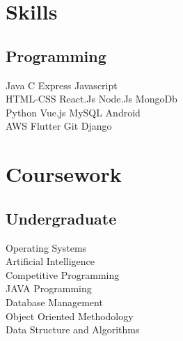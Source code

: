 \documentclass[]{deedy-resume-openfont}
\begin{document}
\begin{minipage}[t]{0.33\textwidth}

\section{Skills}
\subsection{Programming}
Java \textbullet{}   C \textbullet{} Express \textbullet{} Javascript \\
HTML-CSS \textbullet{} React.Js \textbullet{} Node.Js \textbullet{} MongoDb \\ 
Python \textbullet{} Vue.js \textbullet{} MySQL \textbullet{} Android \\
AWS \textbullet{} Flutter \textbullet{} Git \textbullet{} Django 
\sectionsep



\section{Coursework}

\subsection{Undergraduate}
Operating Systems \\
Artificial Intelligence \\
Competitive Programming \\
JAVA Programming \\
Database Management \\
Object Oriented Methodology \\
Data Structure and Algorithms \\


%
%

\end{minipage} 
\hfill
\end{document}
